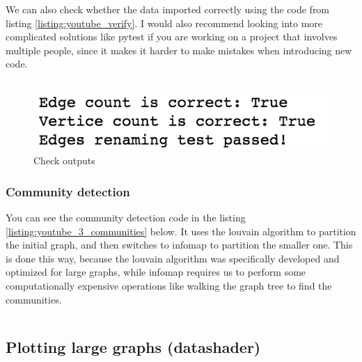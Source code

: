 \documentclass[12pt, a4paper]{article}
\begin{document}
\bgroup
  \inputminted[linenos, breaklines=true, fontsize=\scriptsize, firstnumber=last]{python}{src/youtube/igraph_creation/2_igraph.py}
  \label{listing:youtube_2_igraph}
\egroup

We can also check whether the data imported correctly using the code from listing \ref{listing:youtube_verify}. I would also recommend looking into more complicated solutions like pytest if you are working on a project that involves multiple people, since it makes it harder to make mistakes when introducing new code.

\bgroup
  \inputminted[linenos, breaklines=true, fontsize=\scriptsize, firstnumber=last]{python}{src/youtube/verification.py}
  \label{listing:youtube_verify}
\egroup

\begin{figure}[ht]
    \centering
    \includegraphics{src/youtube/verification}
    \caption{Check outputs}
    \label{fig:youtube_verify}
\end{figure}


\subsubsection{Community detection}

You can see the community detection code in the listing \ref{listing:youtube_3_communities} below. It uses the louvain algorithm to partition the initial graph, and then switches to infomap to partition the smaller one. This is done this way, because the louvain algorithm was specifically developed and optimized for large graphs, while infomap requires us to perform some computationally expensive operations like walking the graph tree to find the communities.

\bgroup
  \inputminted[linenos, breaklines=true, fontsize=\scriptsize, firstnumber=last]{python}{src/youtube/igraph_creation/3_communities.py}
  \label{listing:youtube_3_communities}
\egroup

\subsection{Plotting large graphs (datashader)}
\end{document}
